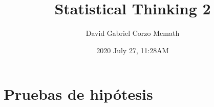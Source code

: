 \documentclass[openany]{book}
\title{Statistical Thinking 2}
\date{2020 July 27, 11:28AM}
\author{David Gabriel Corzo Mcmath}
\begin{document}
\maketitle

\chapter{Pruebas de hipótesis}




\end{document}
